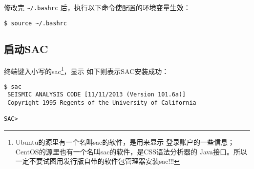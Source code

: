 修改完 \verb|~/.bashrc| 后，执行以下命令使配置的环境变量生效：
\begin{verbatim}
$ source ~/.bashrc
\end{verbatim}

\subsection{启动SAC}
终端键入小写的sac\footnote{Ubuntu的源里有一个名叫sac的软件，是用来显示
登录账户的一些信息；CentOS的源里也有一个名叫sac的软件，是CSS语法分析器的
Java接口。所以一定不要试图用发行版自带的软件包管理器安装sac!!!}，显示
如下则表示SAC安装成功：
\begin{verbatim}
$ sac
 SEISMIC ANALYSIS CODE [11/11/2013 (Version 101.6a)]
 Copyright 1995 Regents of the University of California

SAC>
\end{verbatim}
